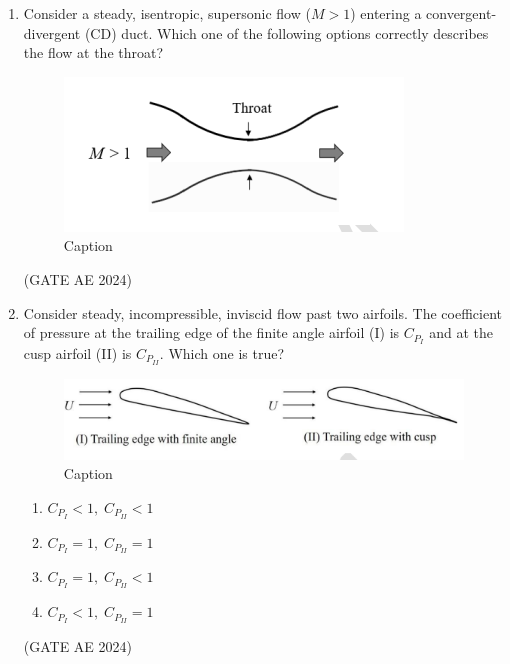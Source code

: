 \documentclass[journal,12pt,onecolumn]{IEEEtran}
\theoremstyle{remark}
\begin{document}
\begin{enumerate}
\item Consider a steady, isentropic, supersonic flow ($M>1$) entering a convergent-divergent (CD) duct. Which one of the following options correctly describes the flow at the throat?  

\begin{figure}[H]
    \centering
    \includegraphics[width=0.5\columnwidth]{figs/Screenshot from 2025-08-23 15-45-45.png}
    \caption{Caption}
    \label{fig:placeholder}
\end{figure}

\begin{enumerate}
\end{enumerate}
\hfill(GATE AE 2024)

\item Consider steady, incompressible, inviscid flow past two airfoils. The coefficient of pressure at the trailing edge of the finite angle airfoil (I) is $C_{P_I}$ and at the cusp airfoil (II) is $C_{P_{II}}$. Which one is true?  

\begin{figure}[H]
    \centering
    \includegraphics[width=0.5\columnwidth]{figs/Screenshot from 2025-08-23 15-54-40.png}
    \caption{Caption}
    \label{fig:placeholder}
\end{figure}

\begin{enumerate}
\item $C_{P_I} < 1,\; C_{P_{II}} < 1$  
\item $C_{P_I} = 1,\; C_{P_{II}} = 1$  
\item $C_{P_I} = 1,\; C_{P_{II}} < 1$  
\item $C_{P_I} < 1,\; C_{P_{II}} = 1$  
\end{enumerate}
\hfill(GATE AE 2024)


\end{enumerate}
\end{document}
